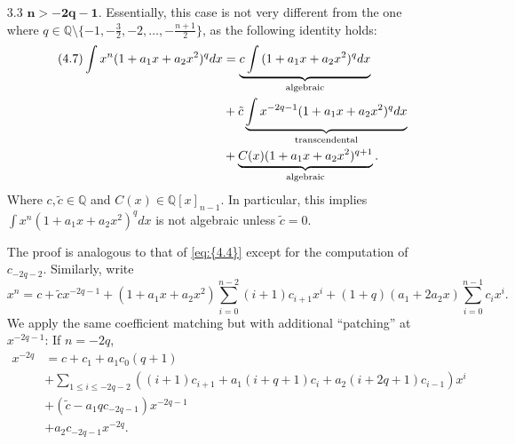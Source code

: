 \documentclass[11pt]{article}
\theoremstyle{definition}
\theoremstyle{plain}
\theoremstyle{remark}
\begin{document}
\begin{enumerate}
\begin{itemize}
\begin{proof}
Consequently, \[\binom{-(n+1)/2}{k}\binom{n}{p-n-1-k} \not\equiv 0 \text{ mod } p \] if and only if 
\[p-n-1 \leq 2k < p-n+1.\]
Observe that since $p$ is odd and $n$ is even, the condition above is equivalent to $k = \frac{p-n-1}{2}$.

Hence, if $m = p-n-1$, the only product of the form 
\[\binom{-(n+1)/2}{k} \binom{k}{p-n-1-k}\]
that appears in $d_{p-n-1}$ and is not divisible by $p$ is the one corresponding to $k = \frac{p-n-1}{2}$. Therefore, $d_{p-n-1}$ is not divisible by $p$, which proves that the denominators of $\frac{d_{k-n-1}}{k}$ become divisible by arbitrarily large primes. So $\sum\limits_{k\geq n+1}\frac{d_{k-n-1}}{k}x^{k}$ is not almost integral.
\end{proof}
Hence, $\int{x^{-2q-1} (1+ax+bx^2)^qdx}$ is not globally bounded and not algebraic.
\item[3.3] $\mathbf{n > -2q-1}$. Essentially, this case is not very different from the one where $q\in\mathbb{Q}\setminus\{-1,-\frac{3}{2},-2,\ldots,-\frac{n+1}{2}\}$, as the following identity holds:
\begin{align*}\label{eq:{4.7}}\tag{4.7}
\int{x^n (1+a_1x+a_2x^2)^q dx} &= \underbrace{c\int{(1+a_1x+a_2x^2)^qdx}}_{\text{algebraic}} \\&+ \tilde{c}\underbrace{\int{x^{-2q-1}(1+a_1x+a_2x^2)^qdx}}_{\text{transcendental}} \\&+ \underbrace{C(x)(1+a_1x+a_2x^2)^{q+1}}_{\text{algebraic}}.
\end{align*}
Where $c, \tilde{c} \in \mathbb{Q}$ and $ C(x) \in \mathbb{Q}[x]_{n-1}$. In particular, this implies $\int{x^n (1+a_1x+a_2x^2)^q dx}$ is not algebraic unless $\tilde{c} = 0$.

The proof is analogous to that of \eqref{eq:{4.4}} except for the computation of $c_{-2q-2}$. Similarly, write
\[x^n = c + \tilde{c}x^{-2q-1}+ (1+a_1x+a_2x^2)\sum\limits_{i=0}^{n-2}(i+1)c_{i+1}x^{i} + (1+q)(a_1+2a_2x)\sum\limits_{i=0}^{n-1}c_ix^i.\]
We apply the same coefficient matching but with additional ``patching'' at $x^{-2q-1}$:
If $n = -2q$, 
\begin{align*}
x^{-2q} &= c + c_1 + a_1c_0(q+1)  \\
&+ \sum\limits_{1 \leq i \leq -2q-2} ((i+1)c_{i+1} + a_1(i+q+1)c_i + a_2(i+2q+1)c_{i-1})x^i \\
& +(\tilde{c}-a_1qc_{-2q-1})x^{-2q-1} \\
& + a_2c_{-2q-1}x^{-2q}.
\end{align*}


\end{itemize}
\end{enumerate}
\end{document}

